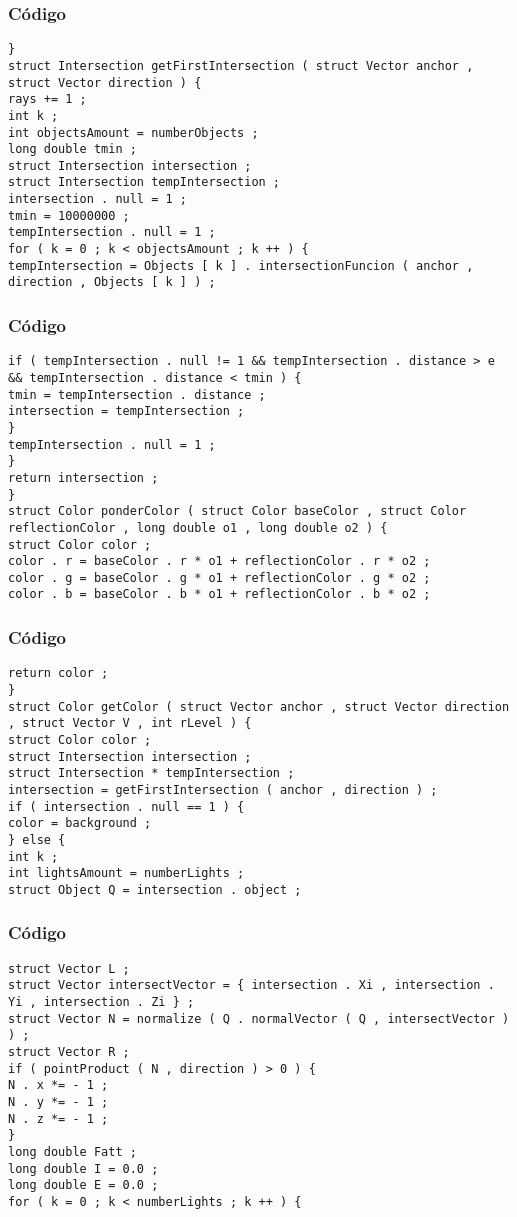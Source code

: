 \documentclass{beamer}
\begin{document}
\begin{frame}[fragile]
\frametitle{C\'odigo}
\begin{verbatim}
} 
struct Intersection getFirstIntersection ( struct Vector anchor , struct Vector direction ) { 
rays += 1 ; 
int k ; 
int objectsAmount = numberObjects ; 
long double tmin ; 
struct Intersection intersection ; 
struct Intersection tempIntersection ; 
intersection . null = 1 ; 
tmin = 10000000 ; 
tempIntersection . null = 1 ; 
for ( k = 0 ; k < objectsAmount ; k ++ ) { 
tempIntersection = Objects [ k ] . intersectionFuncion ( anchor , direction , Objects [ k ] ) ; 
\end{verbatim}
\end{frame}
\begin{frame}[fragile]
\frametitle{C\'odigo}
\begin{verbatim}
if ( tempIntersection . null != 1 && tempIntersection . distance > e && tempIntersection . distance < tmin ) { 
tmin = tempIntersection . distance ; 
intersection = tempIntersection ; 
} 
tempIntersection . null = 1 ; 
} 
return intersection ; 
} 
struct Color ponderColor ( struct Color baseColor , struct Color reflectionColor , long double o1 , long double o2 ) { 
struct Color color ; 
color . r = baseColor . r * o1 + reflectionColor . r * o2 ; 
color . g = baseColor . g * o1 + reflectionColor . g * o2 ; 
color . b = baseColor . b * o1 + reflectionColor . b * o2 ; 
\end{verbatim}
\end{frame}
\begin{frame}[fragile]
\frametitle{C\'odigo}
\begin{verbatim}
return color ; 
} 
struct Color getColor ( struct Vector anchor , struct Vector direction , struct Vector V , int rLevel ) { 
struct Color color ; 
struct Intersection intersection ; 
struct Intersection * tempIntersection ; 
intersection = getFirstIntersection ( anchor , direction ) ; 
if ( intersection . null == 1 ) { 
color = background ; 
} else { 
int k ; 
int lightsAmount = numberLights ; 
struct Object Q = intersection . object ; 
\end{verbatim}
\end{frame}
\begin{frame}[fragile]
\frametitle{C\'odigo}
\begin{verbatim}
struct Vector L ; 
struct Vector intersectVector = { intersection . Xi , intersection . Yi , intersection . Zi } ; 
struct Vector N = normalize ( Q . normalVector ( Q , intersectVector ) ) ; 
struct Vector R ; 
if ( pointProduct ( N , direction ) > 0 ) { 
N . x *= - 1 ; 
N . y *= - 1 ; 
N . z *= - 1 ; 
} 
long double Fatt ; 
long double I = 0.0 ; 
long double E = 0.0 ; 
for ( k = 0 ; k < numberLights ; k ++ ) { 
\end{verbatim}
\end{frame}
\end{document}
